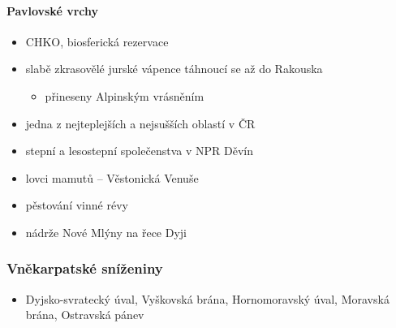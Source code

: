 \paragraph{Pavlovské vrchy}
\begin{itemize}
\item CHKO, biosferická rezervace
\item slabě zkrasovělé jurské vápence táhnoucí se až do Rakouska
	\begin{itemize}
	\item přineseny Alpinským vrásněním
	\end{itemize}
\item jedna z nejteplejších a nejsušších oblastí v ČR
\item stepní a lesostepní společenstva v NPR Děvín
\item lovci mamutů -- Věstonická Venuše
\item pěstování vinné révy
\item nádrže Nové Mlýny na řece Dyji
\end{itemize}

\subsubsection{Vněkarpatské sníženiny}
\begin{itemize}
\item Dyjsko-svratecký úval, Vyškovská brána, Hornomoravský úval, Moravská brána, Ostravská pánev
\end{itemize}



\newpage


